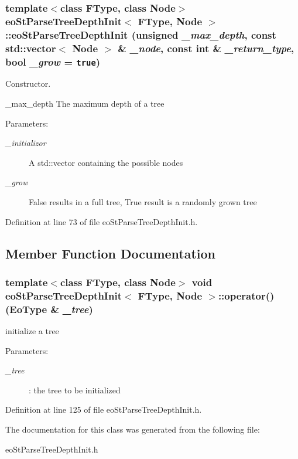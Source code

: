 \subsubsection{\setlength{\rightskip}{0pt plus 5cm}template$<$class FType, class Node$>$ {\bf eo\-St\-Parse\-Tree\-Depth\-Init}$<$ FType, Node $>$::{\bf eo\-St\-Parse\-Tree\-Depth\-Init} (unsigned {\em \_\-max\_\-depth}, const std::vector$<$ Node $>$ \& {\em \_\-node}, const int \& {\em \_\-return\_\-type}, bool {\em \_\-grow} = {\tt true})\hspace{0.3cm}{\tt  [inline]}}\label{classeo_st_parse_tree_depth_init_a0}


Constructor. 

\_\-max\_\-depth The maximum depth of a tree \begin{Desc}
\item[Parameters:]
\begin{description}
\item[{\em \_\-initializor}]A std::vector containing the possible nodes \item[{\em \_\-grow}]False results in a full tree, True result is a randomly grown tree \end{description}
\end{Desc}


Definition at line 73 of file eo\-St\-Parse\-Tree\-Depth\-Init.h.

\subsection{Member Function Documentation}
\subsubsection{\setlength{\rightskip}{0pt plus 5cm}template$<$class FType, class Node$>$ void {\bf eo\-St\-Parse\-Tree\-Depth\-Init}$<$ FType, Node $>$::operator() ({\bf Eo\-Type} \& {\em \_\-tree})\hspace{0.3cm}{\tt  [inline]}}\label{classeo_st_parse_tree_depth_init_a2}


initialize a tree 

\begin{Desc}
\item[Parameters:]
\begin{description}
\item[{\em \_\-tree}]: the tree to be initialized \end{description}
\end{Desc}


Definition at line 125 of file eo\-St\-Parse\-Tree\-Depth\-Init.h.

The documentation for this class was generated from the following file:\begin{CompactItemize}
\item 
eo\-St\-Parse\-Tree\-Depth\-Init.h\end{CompactItemize}
